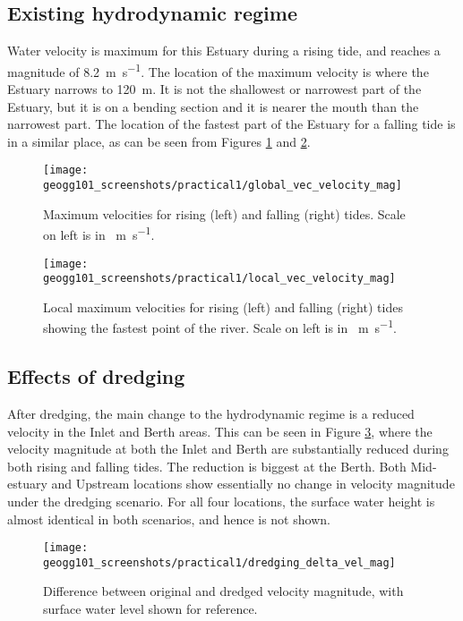 \documentclass{article}
\begin{document}
\subsection{Existing hydrodynamic regime}

Water velocity is maximum for this Estuary during a rising tide, and reaches a magnitude of \SI{8.2}{m.s^{-1}}. The location of the maximum velocity is where the Estuary narrows to \SI{120}{m}. It is not the shallowest or narrowest part of the Estuary, but it is on a bending section and it is nearer the mouth than the narrowest part. The location of the fastest part of the Estuary for a falling tide is in a similar place, as can be seen from Figures \ref{fig:global_velocities} and \ref{fig:local_velocities}.

\begin{figure}[!h]
    \centering
    \texttt{[image: geogg101\_screenshots/practical1/global\_vec\_velocity\_mag]}
    \caption{Maximum velocities for rising (left) and falling (right) tides. Scale on left is in \SI{}{m.s^{-1}}.}
    \label{fig:global_velocities}
\end{figure}

\begin{figure}[!h]
    \centering
    \texttt{[image: geogg101\_screenshots/practical1/local\_vec\_velocity\_mag]}
    \caption{Local maximum velocities for rising (left) and falling (right) tides showing the fastest point of the river. Scale on left is in \SI{}{m.s^{-1}}.}
    \label{fig:local_velocities}
\end{figure}

\subsection{Effects of dredging}

After dredging, the main change to the hydrodynamic regime is a reduced velocity in the Inlet and Berth areas. This can be seen in Figure \ref{fig:dredging_delta_vel_mag}, where the velocity magnitude at both the Inlet and Berth are substantially reduced during both rising and falling tides. The reduction is biggest at the Berth. Both Mid-estuary and Upstream locations show essentially no change in velocity magnitude under the dredging scenario. For all four locations, the surface water height is almost identical in both scenarios, and hence is not shown.

\begin{figure}[!h]
    \centering
    \texttt{[image: geogg101\_screenshots/practical1/dredging\_delta\_vel\_mag]}
    \caption{Difference between original and dredged velocity magnitude, with surface water level shown for reference.}
    \label{fig:dredging_delta_vel_mag}
\end{figure}
\end{document}
